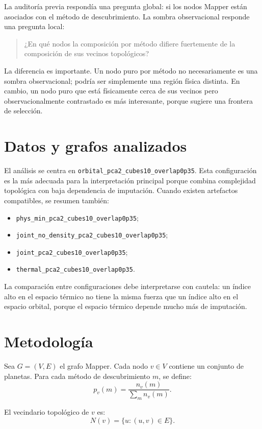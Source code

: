 \documentclass[11pt]{article}
\begin{document}
La auditoría previa respondía una pregunta global: si los nodos Mapper están asociados con el método de descubrimiento. La sombra observacional responde una pregunta local:
\begin{quote}
¿En qué nodos la composición por método difiere fuertemente de la composición de sus vecinos topológicos?
\end{quote}

La diferencia es importante. Un nodo puro por método no necesariamente es una sombra observacional; podría ser simplemente una región física distinta. En cambio, un nodo puro que está físicamente cerca de sus vecinos pero observacionalmente contrastado es más interesante, porque sugiere una frontera de selección.

\section{Datos y grafos analizados}

El análisis se centra en \texttt{orbital\_pca2\_cubes10\_overlap0p35}. Esta configuración es la más adecuada para la interpretación principal porque combina complejidad topológica con baja dependencia de imputación. Cuando existen artefactos compatibles, se resumen también:
\begin{itemize}
  \item \texttt{phys\_min\_pca2\_cubes10\_overlap0p35};
  \item \texttt{joint\_no\_density\_pca2\_cubes10\_overlap0p35};
  \item \texttt{joint\_pca2\_cubes10\_overlap0p35};
  \item \texttt{thermal\_pca2\_cubes10\_overlap0p35}.
\end{itemize}

La comparación entre configuraciones debe interpretarse con cautela: un índice alto en el espacio térmico no tiene la misma fuerza que un índice alto en el espacio orbital, porque el espacio térmico depende mucho más de imputación.

\section{Metodología}

Sea $G=(V,E)$ el grafo Mapper. Cada nodo $v\in V$ contiene un conjunto de planetas. Para cada método de descubrimiento $m$, se define:
\[
p_v(m)=\frac{n_v(m)}{\sum_m n_v(m)}.
\]

El vecindario topológico de $v$ es:
\[
N(v)=\{u:(u,v)\in E\}.
\]
\end{document}
